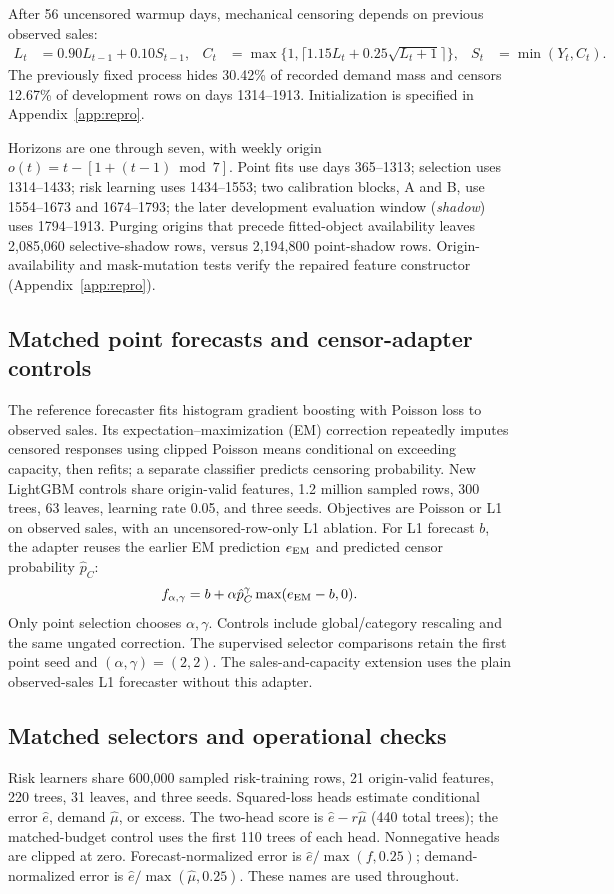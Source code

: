 \documentclass{article}
\begin{document}
After 56 uncensored warmup days, mechanical censoring depends on previous observed sales:
\begin{align}
 L_t&=0.90L_{t-1}+0.10S_{t-1},&
 C_t&=\max\{1,\lceil1.15L_t+0.25\sqrt{L_t+1}\rceil\},&
 S_t&=\min(Y_t,C_t).
 \label{eq:censor}
\end{align}
The previously fixed process hides 30.42\% of recorded demand mass and censors 12.67\% of development rows on days 1314--1913. Initialization is specified in Appendix~\ref{app:repro}.

Horizons are one through seven, with weekly origin $o(t)=t-[1+(t-1)\bmod7]$. Point fits use days 365--1313; selection uses 1314--1433; risk learning uses 1434--1553; two calibration blocks, A and B, use 1554--1673 and 1674--1793; the later development evaluation window (\emph{shadow}) uses 1794--1913. Purging origins that precede fitted-object availability leaves 2,085,060 selective-shadow rows, versus 2,194,800 point-shadow rows. Origin-availability and mask-mutation tests verify the repaired feature constructor (Appendix~\ref{app:repro}).

\subsection{Matched point forecasts and censor-adapter controls}
The reference forecaster fits histogram gradient boosting with Poisson loss to observed sales. Its expectation--maximization (EM) correction repeatedly imputes censored responses using clipped Poisson means conditional on exceeding capacity, then refits; a separate classifier predicts censoring probability. New LightGBM controls share origin-valid features, 1.2 million sampled rows, 300 trees, 63 leaves, learning rate 0.05, and three seeds. Objectives are Poisson or L1 on observed sales, with an uncensored-row-only L1 ablation. For L1 forecast $b$, the adapter reuses the earlier EM prediction $e_{\rm EM}$ and predicted censor probability $\hat p_C$:
\begin{equation}
 f_{\alpha,\gamma}=b+\alpha\hat p_C^\gamma\max(e_{\rm EM}-b,0).
 \label{eq:adapter}
\end{equation}
Only point selection chooses $\alpha,\gamma$. Controls include global/category rescaling and the same ungated correction. The supervised selector comparisons retain the first point seed and $(\alpha,\gamma)=(2,2)$. The sales-and-capacity extension uses the plain observed-sales L1 forecaster without this adapter.

\subsection{Matched selectors and operational checks}
Risk learners share 600,000 sampled risk-training rows, 21 origin-valid features, 220 trees, 31 leaves, and three seeds. Squared-loss heads estimate conditional error $\hat e$, demand $\hat\mu$, or excess. The two-head score is $\hat e-r\hat\mu$ (440 total trees); the matched-budget control uses the first 110 trees of each head. Nonnegative heads are clipped at zero. Forecast-normalized error is $\hat e/\max(f,0.25)$; demand-normalized error is $\hat e/\max(\hat\mu,0.25)$. These names are used throughout.
\end{document}
